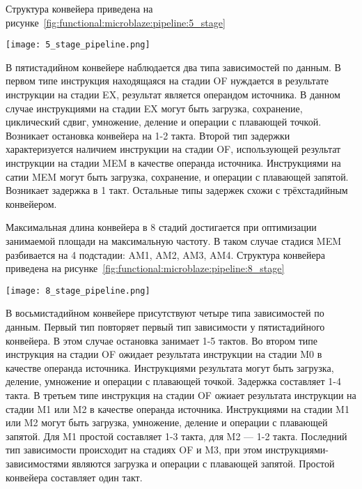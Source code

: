 Структура конвейера приведена на рисунке~\ref{fig:functional:microblaze:pipeline:5_stage}

\begin{center}
  \centering
  \texttt{[image: 5\_stage\_pipeline.png]}
  \label{fig:functional:microblaze:pipeline:5_stage}
\end{center}

В пятистадийном конвейере наблюдается два типа зависимостей по данным. В первом типе
инструкция находящаяся на стадии OF нуждается в результате инструкции на стадии EX,
результат является операндом источника. В данном случае инструкциями на стадии EX
могут быть загрузка, сохранение, циклический сдвиг, умножение, деление и операции
с плавающей точкой. Возникает остановка конвейера на 1-2 такта.
Второй тип задержки характеризуется наличием инструкции на стадии OF, использующей
результат инструкции на стадии MEM в качестве операнда источника. Инструкциями на сатии
MEM могут быть загрузка, сохранение, и операции с плавающей запятой. Возникает задержка
в 1 такт. Остальные типы задержек схожи с трёхстадийным конвейером.

Максимальная длина конвейера в 8 стадий достигается при оптимизации занимаемой площади
на максимальную частоту. В таком случае стадися MEM разбивается на 4 подстадии: AM1,
AM2, AM3, AM4.
Структура конвейера приведена на рисунке~\ref{fig:functional:microblaze:pipeline:8_stage}

\begin{center}
  \centering
  \texttt{[image: 8\_stage\_pipeline.png]}
  \label{fig:functional:microblaze:pipeline:8_stage}
\end{center}

В восьмистадийном конвейере присутствуют четыре типа зависимостей по данным.
Первый тип повторяет первый тип зависимости у пятистадийного конвейера. В
этом случае остановка занимает 1-5 тактов. Во втором типе инструкция на стадии
OF ожидает результата инструкции на стадии M0 в качестве операнда источника.
Инструкциями результата могут быть загрузка, деление, умножение и операции с
плавающей точкой. Задержка составляет 1-4 такта. В третьем типе инструкция
на стадии OF ожиает результата инструкции на стадии M1 или M2 в качестве
операнда источника. Инструкциями на стадии M1 или M2 могут быть загрузка,
умножение, деление и операции с плавающей запятой. Для M1 простой составляет
1-3 такта, для M2 --- 1-2 такта. Последний тип зависимости происходит на стадиях
OF и M3, при этом инструкциями-зависимостями являются загрузка и операции с
плавающей запятой. Простой конвейера составляет один такт.

